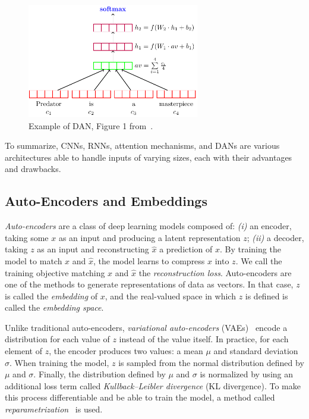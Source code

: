 \begin{figure}
    \centering
    \includegraphics[keepaspectratio, width=.9\textwidth, height=5cm]{Figures/Ch0/dan.png}
    \caption{Example of DAN, Figure 1 from~\cite{dan:2015:iyyer}.}
    \label{fig:nn-architectures-dan}
\end{figure}

To summarize, CNNs, RNNs, attention mechanisms, and DANs are various architectures able to handle inputs of varying sizes, each with their advantages and drawbacks.

\subsection{Auto-Encoders and Embeddings\label{sec:vae}}
\textit{Auto-encoders} are a class of deep learning models composed of:
\textit{(i)} an encoder, taking some $x$ as an input and producing a latent representation $z$;
\textit{(ii)} a decoder, taking $z$ as an input and reconstructing $\hat{x}$ a prediction of $x$.
By training the model to match $x$ and $\hat{x}$, the model learns to compress $x$ into $z$. We call the training objective matching $x$ and $\hat{x}$ the \textit{reconstruction loss}.
Auto-encoders are one of the methods to generate representations of data as vectors. In that case, $z$ is called the \textit{embedding} of $x$, and the real-valued space in which $z$ is defined is called the \textit{embedding space}.

Unlike traditional auto-encoders, \textit{variational auto-encoders} (VAEs)~\cite{vae:2013:kingma} encode a distribution for each value of $z$ instead of the value itself.
In practice, for each element of $z$, the encoder produces two values: a mean $\mu$ and standard deviation $\sigma$.
When training the model, $z$ is sampled from the normal distribution defined by $\mu$ and $\sigma$.
Finally, the distribution defined by $\mu$ and $\sigma$ is normalized by using an additional loss term called \textit{Kullback–Leibler divergence} (KL divergence).
To make this process differentiable and be able to train the model, a method called \textit{reparametrization}~\cite{vae:2013:kingma} is used.

